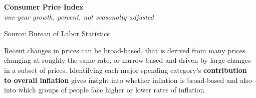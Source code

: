 \documentclass{report}
\makeatletter
\newcommand{\tbllink}[1]{\href{https://raw.githubusercontent.com/bdecon/US-chartbook/master/chartbook/data/#1}{\faTable}}
\newcommand*\short[1]{\expandafter\@gobbletwo\number\numexpr#1\relax}
\newcommand{\dateaxisticks}{
		date coordinates in=x, axis line style={draw=none},
		xmax={2023-11-01},
		max space between ticks=40,	    
		xtick={{1990-01-01}, {1992-01-01}, {1994-01-01}, 
			{1996-01-01}, {1998-01-01}, {2000-01-01}, 
			{2002-01-01}, {2004-01-01}, {2006-01-01},
			{2008-01-01}, {2010-01-01}, {2012-01-01}, {2014-01-01},
		    {2016-01-01}, {2018-01-01}, {2020-01-01}, {2022-01-01}, 
		    {2024-01-01}, {2026-01-01}},
		minor xtick={{1989-01-01}, {1991-01-01}, {1993-01-01},
			{1995-01-01}, {1997-01-01}, {1999-01-01}, 
			{2001-01-01}, {2003-01-01}, {2005-01-01}, {2007-01-01},
		    {2009-01-01}, {2011-01-01}, {2013-01-01}, {2015-01-01},
		    {2017-01-01}, {2019-01-01}, {2021-01-01}, {2023-01-01}, 
		    {2025-01-01}, {2027-01-01}},
		enlarge y limits={0.06}, enlarge x limits={0.01},
		}
\newcommand{\bbar}[2]{extra #1 ticks = {{#2}}, extra #1 tick labels = ,
		extra #1 tick style = {grid=major, grid style={thick, black!25}},}
\newcommand{\stdline}[4]{\addplot[very thick, no markers, color=#1] 
		table [x=#2, y=#3, col sep=comma] {#4};	}
\newcommand{\rbars}{
		\fill[color=black!10] (axis cs:{1990-07-01},\pgfkeysvalueof{/pgfplots/ymin}) rectangle 
			(axis cs:{1991-03-01}, \pgfkeysvalueof{/pgfplots/ymax});
		\fill[color=black!10] (axis cs:{2007-12-01},\pgfkeysvalueof{/pgfplots/ymin}) rectangle 
			(axis cs:{2009-07-01}, \pgfkeysvalueof{/pgfplots/ymax});
		\fill[color=black!10] (axis cs:{2001-03-01},\pgfkeysvalueof{/pgfplots/ymin}) rectangle 
			(axis cs:{2001-11-01}, \pgfkeysvalueof{/pgfplots/ymax});
		\fill[color=black!10] (axis cs:{2020-02-01},\pgfkeysvalueof{/pgfplots/ymin}) rectangle 
			(axis cs:{2020-05-01}, \pgfkeysvalueof{/pgfplots/ymax});}
\makeatother
\begin{document}
{\begin{minipage}{0.76\textwidth}
\normalsize \textbf{Consumer Price Index}\\
\footnotesize{\textit{one-year growth, percent, not seasonally adjusted}}\\
\vspace{3.2cm}

\hspace{3mm} 

\footnotesize{Source: Bureau of Labor Statistics} \hfill \tbllink{cpi.csv}
\vspace{2mm}

\small Recent changes in prices can be broad-based, that is derived from many prices changing at roughly the same rate, or narrow-based and driven by large changes in a subset of prices. Identifying each major spending category's \textbf{contribution to overall inflation} gives insight into whether inflation is broad-based and also into which groups of people face higher or lower rates of inflation.
\end{minipage}

}
\end{document}
